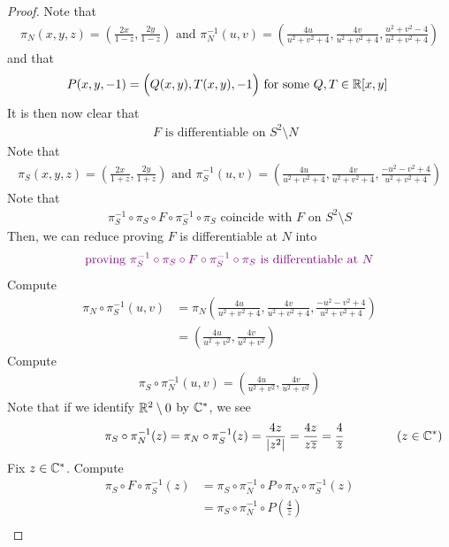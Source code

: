 \documentclass{report}
\begin{document}
\begin{proof}
Note that 
\begin{align*}
\pi_N(x,y,z)=(\frac{2x}{1-z},\frac{2y}{1-z})\text{ and }\pi_N^{-1}(u,v)=(\frac{4u}{u^2+v^2+4},\frac{4v}{u^2+v^2+4},\frac{u^2+v^2-4}{u^2+v^2+4})
\end{align*}
and that 
\begin{align*}
P(x,y,-1)=\Big(Q(x,y),T(x,y),-1 \Big)\text{ for some $Q,T\in\mathbb{R}[x,y]$ }
\end{align*}
It is then now clear that 
\begin{align*}
F\text{ is differentiable on $S^2\setminus N$ }
\end{align*}
Note that 
\begin{align*}
\pi_S(x,y,z)=(\frac{2x}{1+z},\frac{2y}{1+z})\text{ and }\pi_S^{-1}(u,v)=(\frac{4u}{u^2+v^2+4},\frac{4v}{u^2+v^2+4},\frac{-u^2-v^2+4}{u^2+v^2+4})
\end{align*}
Note that 
\begin{align*}
\pi_{S}^{-1}\circ \pi_S\circ F\circ \pi_S^{-1}\circ \pi_S\text{ coincide with $F$ on $S^2\setminus S$}
\end{align*}
Then, we can reduce proving $F$ is differentiable at $N$ into 
\begin{align*}
\textcolor{violet}{\text{ proving }\pi_{S}^{-1}\circ \pi_S\circ F\circ \pi_S^{-1}\circ \pi_S\text{ is differentiable at $N$ }}
\end{align*}
Compute 
\begin{align*}
\pi_N\circ \pi_S^{-1}(u,v)&=\pi_N(\frac{4u}{u^2+v^2+4},\frac{4v}{u^2+v^2+4},\frac{-u^2-v^2+4}{u^2+v^2+4})\\
&=(\frac{4u}{u^2+v^2},\frac{4v}{u^2+v^2})
\end{align*}
Compute
\begin{align*}
\pi_S\circ \pi_N^{-1}(u,v)=(\frac{4u}{u^2+v^2},\frac{4v}{u^2+v^2})
\end{align*}
Note that if we identify $\mathbb{R}^2\setminus 0$ by $\mathbb{C}^*$, we see
\begin{align*}
\hspace{2.5cm}\pi_S\circ \pi_N^{-1}(z)=\pi_N\circ \pi_S^{-1}(z)=\frac{4z}{\left|z^2\right|}=\frac{4z}{z\overline{z}}=\frac{4}{\overline{z}}\hspace{1.5cm}(z\in\mathbb{C}^*)
\end{align*}
Fix $z\in\mathbb{C}^*$. Compute
\begin{align*}
\pi_S\circ F\circ \pi_S^{-1}(z)&=\pi_S \circ \pi_N^{-1}\circ P\circ \pi_N \circ \pi_S^{-1}(z)\\
&=\pi_S\circ \pi_N^{-1}\circ P(\frac{4}{\overline{z}})\\

\end{align*}
\end{proof}
\end{document}
